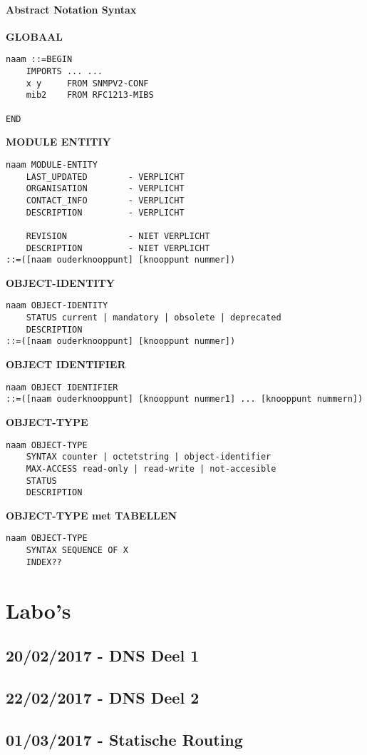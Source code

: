 \documentclass{report}
\begin{document}
\subsection{Abstract Notation Syntax}
\textbf{GLOBAAL}
\begin{lstlisting}
naam ::=BEGIN
	IMPORTS ... ...
	x y 	FROM SNMPV2-CONF
	mib2	FROM RFC1213-MIBS

END
\end{lstlisting}
\textbf{MODULE ENTITIY}
\begin{lstlisting}
naam MODULE-ENTITY
	LAST_UPDATED      	- VERPLICHT
	ORGANISATION		- VERPLICHT
	CONTACT_INFO		- VERPLICHT
	DESCRIPTION			- VERPLICHT
	
	REVISION			- NIET VERPLICHT 
	DESCRIPTION			- NIET VERPLICHT
::=([naam ouderknooppunt] [knooppunt nummer])
\end{lstlisting}
\textbf{OBJECT-IDENTITY}
\begin{lstlisting}
naam OBJECT-IDENTITY
	STATUS current | mandatory | obsolete | deprecated
	DESCRIPTION
::=([naam ouderknooppunt] [knooppunt nummer])
\end{lstlisting}
\textbf{OBJECT IDENTIFIER}
\begin{lstlisting}
naam OBJECT IDENTIFIER
::=([naam ouderknooppunt] [knooppunt nummer1] ... [knooppunt nummern])
\end{lstlisting}
\textbf{OBJECT-TYPE}
\begin{lstlisting}
naam OBJECT-TYPE
	SYNTAX counter | octetstring | object-identifier
	MAX-ACCESS read-only | read-write | not-accesible
	STATUS
	DESCRIPTION
\end{lstlisting}
\textbf{OBJECT-TYPE met TABELLEN}
\begin{lstlisting}
naam OBJECT-TYPE
	SYNTAX SEQUENCE OF X
	INDEX??

\end{lstlisting}
\part{Labo's}

\chapter{20/02/2017 - DNS Deel 1}

\chapter{22/02/2017 - DNS Deel 2}

\chapter{01/03/2017 - Statische Routing}
\end{document}
